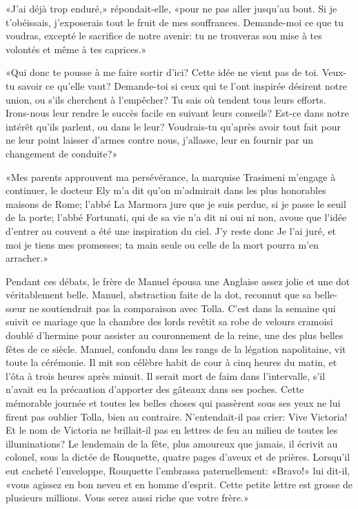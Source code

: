 «J'ai déjà trop enduré,» répondait-elle, «pour ne pas aller jusqu'au bout. Si je t'obéissais, j'exposerais tout le fruit de mes souffrances. Demande-moi ce que tu voudras, excepté le sacrifice de notre avenir: tu ne trouveras sou mise à tes volontés et même à tes caprices.»

«Qui donc te pousse à me faire sortir d'ici? Cette idée ne vient pas de toi. Veux-tu savoir ce qu'elle vaut? Demande-toi si ceux qui te l'ont inspirée désirent notre union, ou s'ils cherchent à l'empêcher? Tu sais où tendent tous leurs efforts. Irons-nous leur rendre le succès facile en suivant leurs conseils? Est-ce dans notre intérêt qu'ils parlent, ou dans le leur? Voudrais-tu qu'après avoir tout fait pour ne leur point laisser d'armes contre nous, j'allasse, leur en fournir par un changement de conduite?»

«Mes parents approuvent ma persévérance, la marquise Trasimeni m'engage à continuer, le docteur Ely m'a dit qu'on m'admirait dans les plus honorables maisons de Rome; l'abbé La Marmora jure que je suis perdue, si je passe le seuil de la porte; l'abbé Fortunati, qui de sa vie n'a dit ni oui ni non, avoue que l'idée d'entrer au couvent a été une inspiration du ciel. J'y reste donc Je l'ai juré, et moi je tiens mes promesses; ta main seule ou celle de la mort pourra m'en arracher.»

Pendant ces débats, le frère de Manuel épousa une Anglaise assez jolie et une dot véritablement belle. Manuel, abstraction faite de la dot, reconnut que sa belle-s\oe{}ur ne soutiendrait pas la comparaison avec Tolla. C'est dans la semaine qui suivit ce mariage que la chambre des lords revêtit sa robe de velours cramoisi doublé d'hermine pour assister au couronnement de la reine, une des plus belles fêtes de ce siècle. Manuel, confondu dans les rangs de la légation napolitaine, vit toute la cérémonie. Il mit son célèbre habit de cour à cinq heures du matin, et l'ôta à trois heures après minuit. Il serait mort de faim dans l'intervalle, s'il n'avait eu la précaution d'apporter des gâteaux dans ses poches. Cette mémorable journée et toutes les belles choses qui passèrent sous ses yeux ne lui firent pas oublier Tolla, bien au contraire. N'entendait-il pas crier: Vive Victoria! Et le nom de Victoria ne brillait-il pas en lettres de feu au milieu de toutes les illuminations? Le lendemain de la fête, plus amoureux que jamais, il écrivit au colonel, sous la dictée de Rouquette, quatre pages d'aveux et de prières. Lorsqu'il eut cacheté l'enveloppe, Rouquette l'embrassa paternellement: «Bravo!» lui dit-il, «vous agissez en bon neveu et en homme d'esprit. Cette petite lettre est grosse de plusieurs millions. Vous serez aussi riche que votre frère.»

